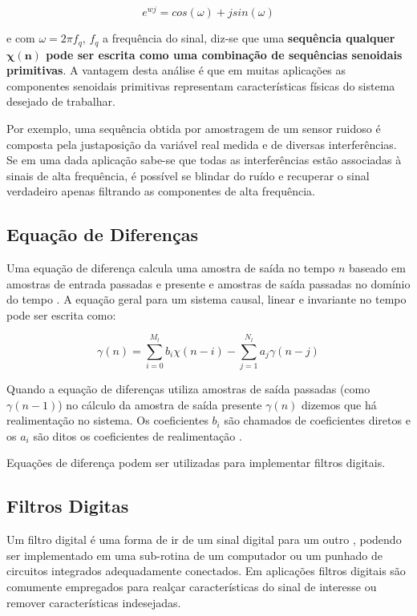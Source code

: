{\begin{equation}
\label{eq:euler-equation}
e^{wj} = cos(\omega) + j sin(\omega)
\end{equation}

e com $\omega = 2\pi f_q$, $f_q$ a frequência do sinal, diz-se que uma \textbf{sequência
qualquer $\bm{\chi(n)}$ pode ser escrita como uma combinação de sequências senoidais
primitivas}. A vantagem desta análise é que em muitas aplicações as componentes
senoidais primitivas representam características físicas do sistema desejado de trabalhar. 

Por exemplo, uma sequência obtida por amostragem de um sensor ruidoso é composta
pela justaposição da variável real medida e de diversas interferências. Se em
uma dada aplicação sabe-se que todas as interferências estão associadas à sinais
de alta frequência, é possível se blindar do ruído e recuperar o sinal verdadeiro
apenas filtrando as componentes de alta frequência.

\subsection{Equação de Diferenças}

Uma equação de diferença calcula uma amostra de saída no tempo $n$ baseado em amostras de entrada passadas e presente e amostras de saída passadas no domínio do tempo \cite{classnote-on-difference-equation}. A equação geral para um sistema causal, linear e invariante no tempo pode ser escrita como:

\begin{equation}
\gamma(n) = \sum_{i=0}^{M_l}b_i \chi(n-i) - \sum_{j=1}^{N_l}a_j \gamma(n-j) 
\end{equation}

Quando a equação de diferenças utiliza amostras de saída passadas (como $\gamma(n-1)$) no cálculo da amostra de saída presente $\gamma(n)$ dizemos que há realimentação no sistema. Os coeficientes $b_i$ são chamados de coeficientes diretos e os $a_i$ são ditos os coeficientes de realimentação \cite{classnote-on-difference-equation}.

Equações de diferença podem ser utilizadas para implementar filtros digitais.

\subsection{Filtros Digitas}

Um filtro digital é uma forma de ir de um sinal digital para um outro \cite{classnote-on-intro-to-digital-filters}, podendo ser implementado em uma sub-rotina de um computador ou um punhado de circuitos integrados adequadamente conectados. Em aplicações filtros digitais são comumente empregados para realçar características do sinal de interesse ou remover características indesejadas.

}
